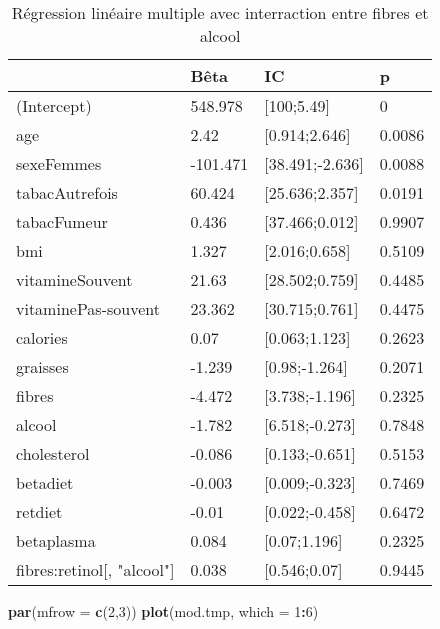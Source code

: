 \documentclass[]{article}
\newenvironment{Shaded}{\begin{snugshade}}{\end{snugshade}}
\newcommand{\KeywordTok}[1]{\textcolor[rgb]{0.13,0.29,0.53}{\textbf{#1}}}
\newcommand{\DataTypeTok}[1]{\textcolor[rgb]{0.13,0.29,0.53}{#1}}
\newcommand{\DecValTok}[1]{\textcolor[rgb]{0.00,0.00,0.81}{#1}}
\newcommand{\OperatorTok}[1]{\textcolor[rgb]{0.81,0.36,0.00}{\textbf{#1}}}
\newcommand{\NormalTok}[1]{#1}
\begin{document}
\begin{table}

\caption{\label{tab:unnamed-chunk-76}Régression linéaire multiple avec interraction entre fibres et alcool}
\centering
\begin{tabular}[t]{l|l|l|l}
\hline
  & Bêta & IC & p\\
\hline
\rowcolor[HTML]{BBD2E1}  (Intercept) & 548.978 & [100;5.49] & 0\\
\hline
age & 2.42 & [0.914;2.646] & 0.0086\\
\hline
\rowcolor[HTML]{BBD2E1}  sexeFemmes & -101.471 & [38.491;-2.636] & 0.0088\\
\hline
tabacAutrefois & 60.424 & [25.636;2.357] & 0.0191\\
\hline
\rowcolor[HTML]{BBD2E1}  tabacFumeur & 0.436 & [37.466;0.012] & 0.9907\\
\hline
bmi & 1.327 & [2.016;0.658] & 0.5109\\
\hline
\rowcolor[HTML]{BBD2E1}  vitamineSouvent & 21.63 & [28.502;0.759] & 0.4485\\
\hline
vitaminePas-souvent & 23.362 & [30.715;0.761] & 0.4475\\
\hline
\rowcolor[HTML]{BBD2E1}  calories & 0.07 & [0.063;1.123] & 0.2623\\
\hline
graisses & -1.239 & [0.98;-1.264] & 0.2071\\
\hline
\rowcolor[HTML]{BBD2E1}  fibres & -4.472 & [3.738;-1.196] & 0.2325\\
\hline
alcool & -1.782 & [6.518;-0.273] & 0.7848\\
\hline
\rowcolor[HTML]{BBD2E1}  cholesterol & -0.086 & [0.133;-0.651] & 0.5153\\
\hline
betadiet & -0.003 & [0.009;-0.323] & 0.7469\\
\hline
\rowcolor[HTML]{BBD2E1}  retdiet & -0.01 & [0.022;-0.458] & 0.6472\\
\hline
betaplasma & 0.084 & [0.07;1.196] & 0.2325\\
\hline
\rowcolor[HTML]{BBD2E1}  fibres:retinol[, "alcool"] & 0.038 & [0.546;0.07] & 0.9445\\
\hline
\end{tabular}
\end{table}

\begin{Shaded}
\begin{Highlighting}[]
\KeywordTok{par}\NormalTok{(}\DataTypeTok{mfrow =} \KeywordTok{c}\NormalTok{(}\DecValTok{2}\NormalTok{,}\DecValTok{3}\NormalTok{))}
\KeywordTok{plot}\NormalTok{(mod.tmp, }\DataTypeTok{which =} \DecValTok{1}\OperatorTok{:}\DecValTok{6}\NormalTok{)}
\end{Highlighting}
\end{Shaded}
\end{document}
